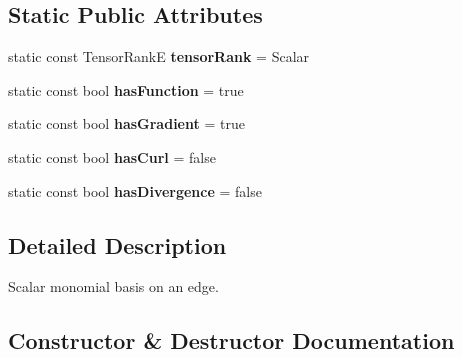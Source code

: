 \subsection*{Static Public Attributes}
\begin{DoxyCompactItemize}
\item 
\mbox{\label{classHArDCore3D_1_1MonomialScalarBasisEdge_a30e0bd3b18537fba53da8cdc1d0fcb3c}} 
static const Tensor\+RankE {\bfseries tensor\+Rank} = Scalar
\item 
\mbox{\label{classHArDCore3D_1_1MonomialScalarBasisEdge_a2f68f9c5072ae2c9fcc578af10bd3820}} 
static const bool {\bfseries has\+Function} = true
\item 
\mbox{\label{classHArDCore3D_1_1MonomialScalarBasisEdge_a1c7fc3e0531c2a69052ee6a4cf768689}} 
static const bool {\bfseries has\+Gradient} = true
\item 
\mbox{\label{classHArDCore3D_1_1MonomialScalarBasisEdge_a3a78726fb76de93daeb4d1d3f74be216}} 
static const bool {\bfseries has\+Curl} = false
\item 
\mbox{\label{classHArDCore3D_1_1MonomialScalarBasisEdge_a236b6c30dd086def8c0826441a5e110c}} 
static const bool {\bfseries has\+Divergence} = false
\end{DoxyCompactItemize}


\subsection{Detailed Description}
Scalar monomial basis on an edge. 

\subsection{Constructor \& Destructor Documentation}
\mbox{\label{classHArDCore3D_1_1MonomialScalarBasisEdge_a5d0c563a52d9debf6889e2f994342ec7}} 
